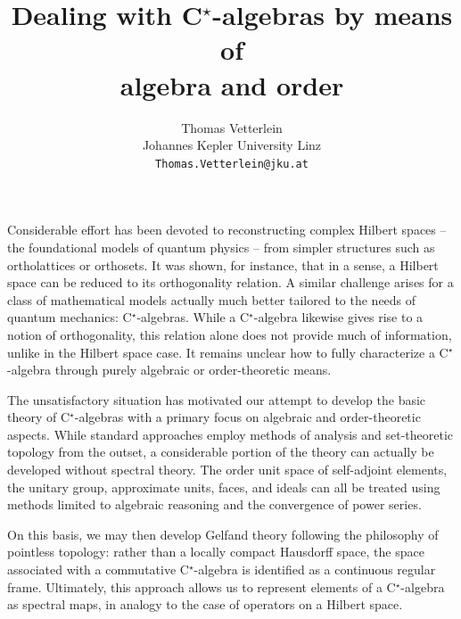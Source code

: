 \documentclass[a4paper]{article} %
\date{} %
\begin{document}
\setcounter{page}{1} %

\title{Dealing with {\rm C}$^\star$-algebras by means of \\ algebra and order}

\author{Thomas Vetterlein \\ %
       Johannes Kepler University Linz \\ %
       \texttt{Thomas.Vetterlein@jku.at} %
       }%

\maketitle

Considerable effort has been devoted to reconstructing complex Hilbert spa\-ces -- the foundational models of quantum physics -- from simpler structures such as ortholattices or orthosets. It was shown, for instance, that in a sense, a Hilbert space can be reduced to its orthogonality relation. A similar challenge arises for a class of mathematical models actually much better tailored to the needs of quantum mechanics: {\rm C}$^\star$-algebras. While a {\rm C}$^\star$-algebra likewise gives rise to a notion of orthogonality, this relation alone does not provide much of information, unlike in the Hilbert space case. It remains unclear how to fully characterize a {\rm C}$^\star$-algebra through purely algebraic or order-theoretic means.

The unsatisfactory situation has motivated our attempt to develop the basic theory of {\rm C}$^\star$-algebras with a primary focus on algebraic and order-theoretic aspects. While standard approaches employ methods of analysis and set-theoretic topology from the outset, a considerable portion of the theory can actually be developed without spectral theory. The order unit space of self-adjoint elements, the unitary group, approximate units, faces, and ideals can all be treated using methods limited to algebraic reasoning and the convergence of power series. 

On this basis, we may then develop Gelfand theory following the philosophy of pointless topology: rather than a locally compact Hausdorff space, the space associated with a commutative {\rm C}$^\star$-algebra is identified as a continuous regular frame. Ultimately, this approach allows us to represent elements of a {\rm C}$^\star$-algebra as spectral maps, in analogy to the case of operators on a Hilbert space.
\end{document}
